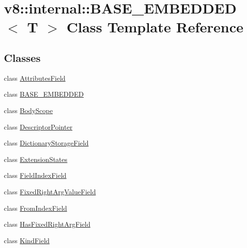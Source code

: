 \hypertarget{classv8_1_1internal_1_1_b_a_s_e___e_m_b_e_d_d_e_d}{}\section{v8\+:\+:internal\+:\+:B\+A\+S\+E\+\_\+\+E\+M\+B\+E\+D\+D\+ED$<$ T $>$ Class Template Reference}
\label{classv8_1_1internal_1_1_b_a_s_e___e_m_b_e_d_d_e_d}
\subsection*{Classes}
\begin{DoxyCompactItemize}
\item 
class \hyperlink{classv8_1_1internal_1_1_b_a_s_e___e_m_b_e_d_d_e_d_1_1_attributes_field}{Attributes\+Field}
\item 
class \hyperlink{classv8_1_1internal_1_1_b_a_s_e___e_m_b_e_d_d_e_d_1_1_b_a_s_e___e_m_b_e_d_d_e_d}{B\+A\+S\+E\+\_\+\+E\+M\+B\+E\+D\+D\+ED}
\item 
class \hyperlink{classv8_1_1internal_1_1_b_a_s_e___e_m_b_e_d_d_e_d_1_1_body_scope}{Body\+Scope}
\item 
class \hyperlink{classv8_1_1internal_1_1_b_a_s_e___e_m_b_e_d_d_e_d_1_1_descriptor_pointer}{Descriptor\+Pointer}
\item 
class \hyperlink{classv8_1_1internal_1_1_b_a_s_e___e_m_b_e_d_d_e_d_1_1_dictionary_storage_field}{Dictionary\+Storage\+Field}
\item 
class \hyperlink{classv8_1_1internal_1_1_b_a_s_e___e_m_b_e_d_d_e_d_1_1_extension_states}{Extension\+States}
\item 
class \hyperlink{classv8_1_1internal_1_1_b_a_s_e___e_m_b_e_d_d_e_d_1_1_field_index_field}{Field\+Index\+Field}
\item 
class \hyperlink{classv8_1_1internal_1_1_b_a_s_e___e_m_b_e_d_d_e_d_1_1_fixed_right_arg_value_field}{Fixed\+Right\+Arg\+Value\+Field}
\item 
class \hyperlink{classv8_1_1internal_1_1_b_a_s_e___e_m_b_e_d_d_e_d_1_1_from_index_field}{From\+Index\+Field}
\item 
class \hyperlink{classv8_1_1internal_1_1_b_a_s_e___e_m_b_e_d_d_e_d_1_1_has_fixed_right_arg_field}{Has\+Fixed\+Right\+Arg\+Field}
\item 
class \hyperlink{classv8_1_1internal_1_1_b_a_s_e___e_m_b_e_d_d_e_d_1_1_kind_field}{Kind\+Field}
\item 

\end{DoxyCompactItemize}
